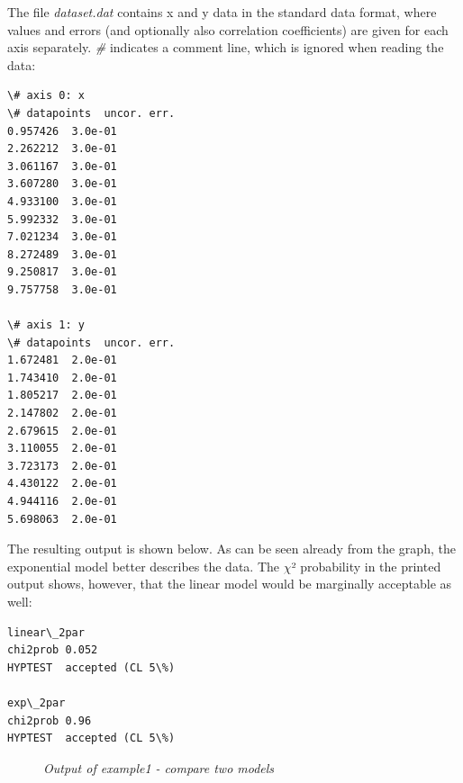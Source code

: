 \documentclass[a4paper,10pt,english]{sphinxmanual}
\begin{document}
The file \emph{dataset.dat} contains x and y data in the standard  data
format, where values and errors (and optionally also correlation coefficients)
are given for each axis separately. \emph{\#} indicates a comment line, which
is ignored when reading the data:

\begin{Verbatim}[commandchars=\\\{\}]
\# axis 0: x
\# datapoints  uncor. err.
0.957426  3.0e-01
2.262212  3.0e-01
3.061167  3.0e-01
3.607280  3.0e-01
4.933100  3.0e-01
5.992332  3.0e-01
7.021234  3.0e-01
8.272489  3.0e-01
9.250817  3.0e-01
9.757758  3.0e-01

\# axis 1: y
\# datapoints  uncor. err.
1.672481  2.0e-01
1.743410  2.0e-01
1.805217  2.0e-01
2.147802  2.0e-01
2.679615  2.0e-01
3.110055  2.0e-01
3.723173  2.0e-01
4.430122  2.0e-01
4.944116  2.0e-01
5.698063  2.0e-01
\end{Verbatim}

The resulting output is shown below. As can be seen already
from the graph, the exponential model better describes the
data. The \(\chi\)² probability in the printed output shows, however,
that the linear model would be marginally acceptable as well:

\begin{Verbatim}[commandchars=\\\{\}]
linear\_2par
chi2prob 0.052
HYPTEST  accepted (CL 5\%)

exp\_2par
chi2prob 0.96
HYPTEST  accepted (CL 5\%)
\end{Verbatim}
\begin{figure}[htbp]
\centering
\capstart

\caption{\emph{Output of example1 - compare two models}}\end{figure}
\end{document}

